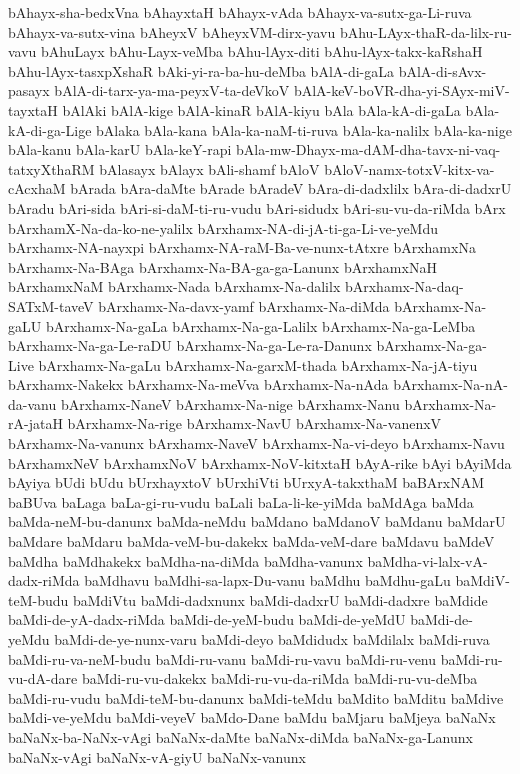 {bAhayx-sha-bedxVna
bAhayxtaH
bAhayx-vAda
bAhayx-va-sutx-ga-Li-ruva
bAhayx-va-sutx-vina
bAheyxV
bAheyxVM-dirx-yavu
bAhu-LAyx-thaR-da-lilx-ru-vavu
bAhuLayx
bAhu-Layx-veMba
bAhu-lAyx-diti
bAhu-lAyx-takx-kaRshaH
bAhu-lAyx-tasxpXshaR
bAki-yi-ra-ba-hu-deMba
bAlA-di-gaLa
bAlA-di-sAvx-pasayx
bAlA-di-tarx-ya-ma-peyxV-ta-deVkoV
bAlA-keV-boVR-dha-yi-SAyx-miV-tayxtaH
bAlAki
bAlA-kige
bAlA-kinaR
bAlA-kiyu
bAla
bAla-kA-di-gaLa
bAla-kA-di-ga-Lige
bAlaka
bAla-kana
bAla-ka-naM-ti-ruva
bAla-ka-nalilx
bAla-ka-nige
bAla-kanu
bAla-karU
bAla-keY-rapi
bAla-mw-Dhayx-ma-dAM-dha-tavx-ni-vaq-tatxyXthaRM
bAlasayx
bAlayx
bAli-shamf
bAloV
bAloV-namx-totxV-kitx-va-cAcxhaM
bArada
bAra-daMte
bArade
bAradeV
bAra-di-dadxlilx
bAra-di-dadxrU
bAradu
bAri-sida
bAri-si-daM-ti-ru-vudu
bAri-sidudx
bAri-su-vu-da-riMda
bArx
bArxhamX-Na-da-ko-ne-yalilx
bArxhamx-NA-di-jA-ti-ga-Li-ve-yeMdu
bArxhamx-NA-nayxpi
bArxhamx-NA-raM-Ba-ve-nunx-tAtxre
bArxhamxNa
bArxhamx-Na-BAga
bArxhamx-Na-BA-ga-ga-Lanunx
bArxhamxNaH
bArxhamxNaM
bArxhamx-Nada
bArxhamx-Na-dalilx
bArxhamx-Na-daq-SATxM-taveV
bArxhamx-Na-davx-yamf
bArxhamx-Na-diMda
bArxhamx-Na-gaLU
bArxhamx-Na-gaLa
bArxhamx-Na-ga-Lalilx
bArxhamx-Na-ga-LeMba
bArxhamx-Na-ga-Le-raDU
bArxhamx-Na-ga-Le-ra-Danunx
bArxhamx-Na-ga-Live
bArxhamx-Na-gaLu
bArxhamx-Na-garxM-thada
bArxhamx-Na-jA-tiyu
bArxhamx-Nakekx
bArxhamx-Na-meVva
bArxhamx-Na-nAda
bArxhamx-Na-nA-da-vanu
bArxhamx-NaneV
bArxhamx-Na-nige
bArxhamx-Nanu
bArxhamx-Na-rA-jataH
bArxhamx-Na-rige
bArxhamx-NavU
bArxhamx-Na-vanenxV
bArxhamx-Na-vanunx
bArxhamx-NaveV
bArxhamx-Na-vi-deyo
bArxhamx-Navu
bArxhamxNeV
bArxhamxNoV
bArxhamx-NoV-kitxtaH
bAyA-rike
bAyi
bAyiMda
bAyiya
bUdi
bUdu
bUrxhayxtoV
bUrxhiVti
bUrxyA-takxthaM
baBArxNAM
baBUva
baLaga
baLa-gi-ru-vudu
baLali
baLa-li-ke-yiMda
baMdAga
baMda
baMda-neM-bu-danunx
baMda-neMdu
baMdano
baMdanoV
baMdanu
baMdarU
baMdare
baMdaru
baMda-veM-bu-dakekx
baMda-veM-dare
baMdavu
baMdeV
baMdha
baMdhakekx
baMdha-na-diMda
baMdha-vanunx
baMdha-vi-lalx-vA-dadx-riMda
baMdhavu
baMdhi-sa-lapx-Du-vanu
baMdhu
baMdhu-gaLu
baMdiV-teM-budu
baMdiVtu
baMdi-dadxnunx
baMdi-dadxrU
baMdi-dadxre
baMdide
baMdi-de-yA-dadx-riMda
baMdi-de-yeM-budu
baMdi-de-yeMdU
baMdi-de-yeMdu
baMdi-de-ye-nunx-varu
baMdi-deyo
baMdidudx
baMdilalx
baMdi-ruva
baMdi-ru-va-neM-budu
baMdi-ru-vanu
baMdi-ru-vavu
baMdi-ru-venu
baMdi-ru-vu-dA-dare
baMdi-ru-vu-dakekx
baMdi-ru-vu-da-riMda
baMdi-ru-vu-deMba
baMdi-ru-vudu
baMdi-teM-bu-danunx
baMdi-teMdu
baMdito
baMditu
baMdive
baMdi-ve-yeMdu
baMdi-veyeV
baMdo-Dane
baMdu
baMjaru
baMjeya
baNaNx
baNaNx-ba-NaNx-vAgi
baNaNx-daMte
baNaNx-diMda
baNaNx-ga-Lanunx
baNaNx-vAgi
baNaNx-vA-giyU
baNaNx-vanunx
}

